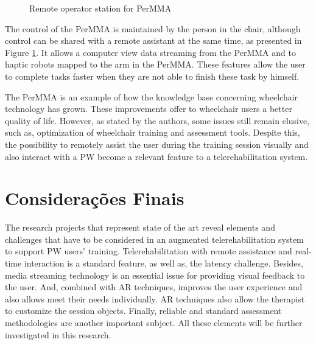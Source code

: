 \begin{figure}[!htbp]
\begin{minipage}{0.45\linewidth}
\caption{Remote operator station for PerMMA \cite{cooper2012}} \label{subfig:cooper2012-remoteOp}
\end{minipage}
\end{figure}

The control of the PerMMA is maintained by the person in the chair, although control can be shared with a remote assistant at the same time, as presented in Figure \ref{subfig:cooper2012-remoteOp}. It allows a computer view data streaming from the PerMMA and to haptic robots mapped to the arm in the PerMMA. These features allow the user to complete tasks faster when they are not able to finish these task by himself.


The PerMMA is an example of how the knowledge base concerning wheelchair technology has grown. These improvements offer to wheelchair users a better quality of life. However, as stated by the authors, some issues still remain elusive, such as, optimization of wheelchair training and assessment tools. Despite this,  the possibility to remotely assist the user during the training session visually and also interact with a PW become a relevant feature to a telerehabilitation system.

\section{Considerações Finais}

The research projects that represent state of the art reveal elements and challenges that have to be considered in an augmented telerehabilitation system to support PW users' training. Telerehabilitation with remote assistance and real-time interaction is a standard feature, as well as, the latency challenge. Besides, media streaming technology is an essential issue for providing visual feedback to the user. And, combined with AR techniques, improves the user experience and also allows meet their needs individually. AR techniques also allow the therapist to customize the session objects. Finally, reliable and standard assessment methodologies are another important subject. All these elements will be further investigated in this research. 


